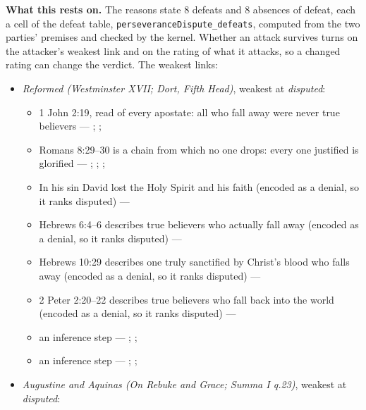 \documentclass[11pt]{article}
\begin{document}
\par\noindent\textbf{What this rests on.} The reasons state 8 defeats and 8 absences of defeat, each a cell of the defeat table, \texttt{perseverance\allowbreak{}Dispute\_\allowbreak{}defeats}, computed from the two parties' premises and checked by the kernel. Whether an attack survives turns on the attacker's weakest link and on the rating of what it attacks, so a changed rating can change the verdict. The weakest links:
\begin{itemize}
\item \emph{Reformed (Westminster XVII; Dort, Fifth Head)}, weakest at \emph{disputed}:
\begin{itemize}
\item 1 John 2:19, read of every apostate: all who fall away were never true believers --- \cite[594--595]{owen-works-11-perseverance}; \cite[191--192]{calvin-commentaries-catholic-epistles}; \cite[479--480]{npnf1-05-1887}
\item Romans 8:29–30 is a chain from which no one drops: every one justified is glorified --- \cite[582--583]{schaff-creeds-christendom-3-1977}; \cite[557]{schaff-creeds-christendom-3-1977}; \cite[384]{wesley-explanatory-notes-nt}; \cite[413]{wesley-works-9-1827}
\item In his sin David lost the Holy Spirit and his faith (encoded as a denial, so it ranks disputed) --- \cite[299--300]{calvin-psalms-2-1846}
\item Hebrews 6:4–6 describes true believers who actually fall away (encoded as a denial, so it ranks disputed) --- \cite[137--138]{calvin-hebrews-1853}
\item Hebrews 10:29 describes one truly sanctified by Christ’s blood who falls away (encoded as a denial, so it ranks disputed) --- \cite[545--546]{owen-works-23-1855}
\item 2 Peter 2:20–22 describes true believers who fall back into the world (encoded as a denial, so it ranks disputed) --- \cite[410--412]{calvin-commentaries-catholic-epistles}
\item an inference step --- \cite[444--445]{wesley-works-9-1827}; \cite[415--416]{calvin-commentary-john-1847}; \cite[Solid Declaration XI.45]{concordia-triglotta-1921}
\item an inference step --- \cite[Trent, Session VI (1547), ch. 13]{tanner-decrees-1990}; \cite[40]{waterworth-trent-1848}; \cite[Solid Declaration XI.42]{concordia-triglotta-1921}
\end{itemize}
\item \emph{Augustine and Aquinas (On Rebuke and Grace; Summa I q.23)}, weakest at \emph{disputed}:

\end{itemize}
\end{document}
